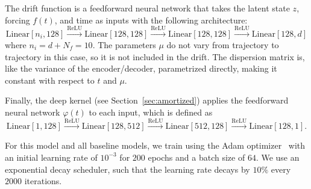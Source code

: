 \documentclass{article}
\begin{document}
	The drift function is a feedforward neural network that takes the latent state $z$, forcing $f(t)$, and time as inputs with the following architecture:
	\begin{equation*}
		\textrm{Linear}[n_i, 128] \xrightarrow{\text{ReLU}} \textrm{Linear}[128, 128] \xrightarrow{\text{ReLU}} \textrm{Linear}[128, 128] \xrightarrow{\text{ReLU}} \textrm{Linear}[128, d]
	\end{equation*}
	where $n_i = d+N_f= 10$. The parameters $\mu$ do not vary from trajectory to trajectory in this case, so it is not included in the drift. The dispersion matrix is, like the variance of the encoder/decoder, parametrized directly, making it constant with respect to $t$ and $\mu$.
	
	Finally, the deep kernel (see Section~\ref{sec:amortized}) applies the feedforward neural network $\varphi(t)$ to each input, which is defined as
	\begin{equation*}
		\textrm{Linear}[1, 128] \xrightarrow{\text{ReLU}} \textrm{Linear}[128, 512] \xrightarrow{\text{ReLU}} \textrm{Linear}[512, 128] \xrightarrow{\text{ReLU}} \textrm{Linear}[128, 1].
	\end{equation*}
	
	For this model and all baseline models, we train using the Adam optimizer~\cite{Kingma_2017_Adam} with an initial learning rate of $10^{-3}$ for $200$ epochs and a batch size of $64$. We use an exponential decay scheduler, such that the learning rate decays by $10\%$ every $2000$ iterations. 
	
	
\end{document}
